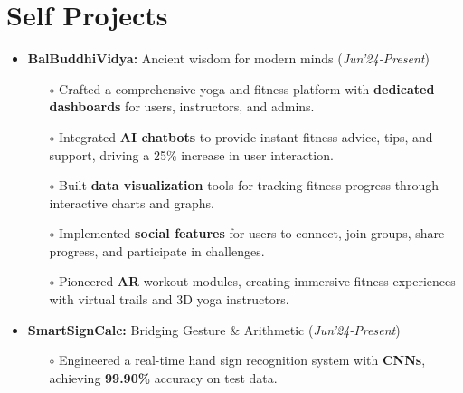 \documentclass[10.8pt, a4paper]{extarticle}
\newcommand{\shorterSection}[1]{\vspace{-10pt}\section{#1}}
\begin{document}
\shorterSection{Self Projects}
\vspace{-2pt}
\begin{itemize}

 \item \textbf{BalBuddhiVidya:}  Ancient wisdom for modern minds
\href{https://github.com/vishalsavarna/BalBuddhiVidya}{\faGithub{}} \hfill(\textit{Jun'24-Present})
	\\[-0.6cm]
	\begin{itemize}
	    \item[$\circ$] Crafted a comprehensive yoga and fitness platform with \textbf{dedicated dashboards} for users, instructors, and admins.\\[-0.6cm]


\item[$\circ$] Integrated \textbf{AI chatbots} to provide instant fitness advice, tips, and support, driving a 25\% increase in user interaction.\\[-0.6cm]

\item[$\circ$] Built \textbf{data visualization} tools for tracking fitness progress through interactive charts and graphs.\\[-0.6cm]

\item[$\circ$] Implemented \textbf{social features} for users to connect, join groups, share progress, and participate in challenges. \\[-0.6cm]

\item[$\circ$] Pioneered \textbf{AR} workout modules, creating immersive fitness experiences with virtual trails and 3D yoga instructors.\\[-0.6cm]


	\end{itemize}



 \item \textbf{SmartSignCalc:} Bridging Gesture \& Arithmetic
\href{https://github.com/vishalsavarna/SmartSignCalc-Bridging_Gesture_and_Arithmetic}{\faGithub{}} \hfill(\textit{Jun'24-Present})
	\\[-0.6cm]
	\begin{itemize}
	    \item[$\circ$] Engineered a real-time hand sign recognition system with \textbf{CNNs}, achieving \textbf{99.90\%} accuracy on test data.\\[-0.6cm]



\end{itemize}
\end{itemize}
\end{document}
